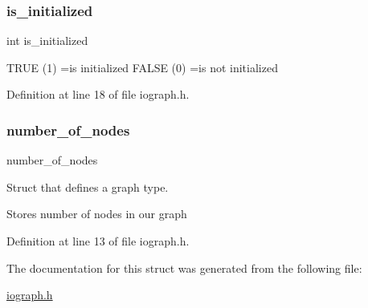 \subsubsection{\texorpdfstring{is\+\_\+initialized}{is\_initialized}}
{\footnotesize\ttfamily int is\+\_\+initialized}

T\+R\+UE (1) =is initialized F\+A\+L\+SE (0) =is not initialized 

Definition at line 18 of file iograph.\+h.

\mbox{\label{structa__graph_af7692a90904fb59313797875671dc890}} 
\subsubsection{\texorpdfstring{number\+\_\+of\+\_\+nodes}{number\_of\_nodes}}
{\footnotesize\ttfamily number\+\_\+of\+\_\+nodes}



Struct that defines a graph type. 

Stores number of nodes in our graph 

Definition at line 13 of file iograph.\+h.



The documentation for this struct was generated from the following file\+:\begin{DoxyCompactItemize}
\item 
\hyperlink{iograph_8h}{iograph.\+h}\end{DoxyCompactItemize}
